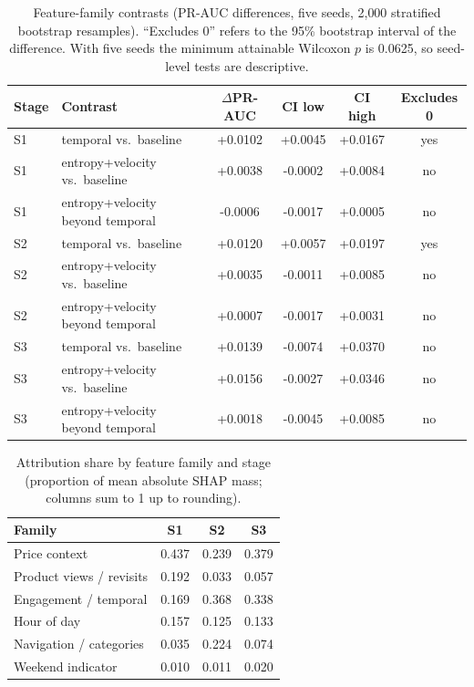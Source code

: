 \documentclass[a4paper]{article}
\begin{document}
\begin{table}[t]
\centering
\caption{Feature-family contrasts (PR-AUC differences, five seeds, 2{,}000
stratified bootstrap resamples). ``Excludes 0'' refers to the 95\%
bootstrap interval of the difference. With five seeds the minimum attainable
Wilcoxon $p$ is 0.0625, so seed-level tests are descriptive.}
\label{tab:ablation}
\small
\begin{tabular}{@{}llS[table-format=+1.4]S[table-format=+1.4]S[table-format=+1.4]c@{}}
\toprule
\textbf{Stage} & \textbf{Contrast} & {$\Delta$PR-AUC} &
{\textbf{CI low}} & {\textbf{CI high}} & \textbf{Excludes 0} \\
\midrule
S1 & temporal vs.\ baseline           & +0.0102 & +0.0045 & +0.0167 & yes \\
S1 & entropy+velocity vs.\ baseline   & +0.0038 & -0.0002 & +0.0084 & no  \\
S1 & entropy+velocity beyond temporal & -0.0006 & -0.0017 & +0.0005 & no  \\
S2 & temporal vs.\ baseline           & +0.0120 & +0.0057 & +0.0197 & yes \\
S2 & entropy+velocity vs.\ baseline   & +0.0035 & -0.0011 & +0.0085 & no  \\
S2 & entropy+velocity beyond temporal & +0.0007 & -0.0017 & +0.0031 & no  \\
S3 & temporal vs.\ baseline           & +0.0139 & -0.0074 & +0.0370 & no  \\
S3 & entropy+velocity vs.\ baseline   & +0.0156 & -0.0027 & +0.0346 & no  \\
S3 & entropy+velocity beyond temporal & +0.0018 & -0.0045 & +0.0085 & no  \\
\bottomrule
\end{tabular}
\end{table}

\begin{table}[t]
\centering
\caption{Attribution share by feature family and stage (proportion of mean
absolute SHAP mass; columns sum to 1 up to rounding).}
\label{tab:migration}
\small
\begin{tabular}{@{}lS[table-format=1.3]S[table-format=1.3]S[table-format=1.3]@{}}
\toprule
\textbf{Family} & {\textbf{S1}} & {\textbf{S2}} & {\textbf{S3}} \\
\midrule
Price context            & 0.437 & 0.239 & 0.379 \\
Product views / revisits & 0.192 & 0.033 & 0.057 \\
Engagement / temporal    & 0.169 & 0.368 & 0.338 \\
Hour of day              & 0.157 & 0.125 & 0.133 \\
Navigation / categories  & 0.035 & 0.224 & 0.074 \\
Weekend indicator        & 0.010 & 0.011 & 0.020 \\
\bottomrule
\end{tabular}
\end{table}
\end{document}
